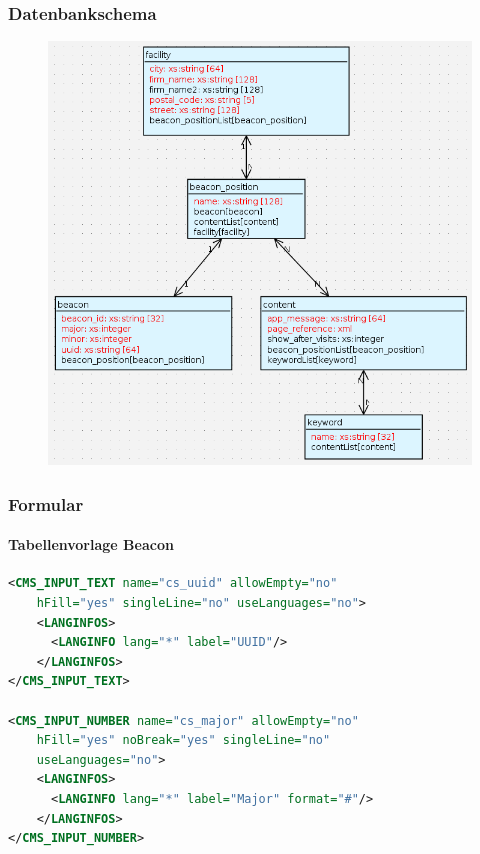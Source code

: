 \documentclass{beamer}
\begin{document}
\begin{frame}
\frametitle{Datenbankschema}

\begin{figure}[!h]
\centering
\includegraphics[scale=0.27]{./Abbildungen/dbschema.png}
\label{fig:dbschema-fs-beacon}
\end{figure}

\end{frame}

\begin{frame}[fragile]
\frametitle{Formular}
\framesubtitle{Tabellenvorlage Beacon}

\begin{lstlisting}[language=XML, basicstyle=\ttfamily\scriptsize]
<CMS_INPUT_TEXT name="cs_uuid" allowEmpty="no" 
    hFill="yes" singleLine="no" useLanguages="no">
    <LANGINFOS>
      <LANGINFO lang="*" label="UUID"/>
    </LANGINFOS>
</CMS_INPUT_TEXT>
	
<CMS_INPUT_NUMBER name="cs_major" allowEmpty="no" 
    hFill="yes" noBreak="yes" singleLine="no" 
    useLanguages="no">
    <LANGINFOS>
      <LANGINFO lang="*" label="Major" format="#"/>
    </LANGINFOS>
</CMS_INPUT_NUMBER>
\end{lstlisting}

\end{frame}
\end{document}
